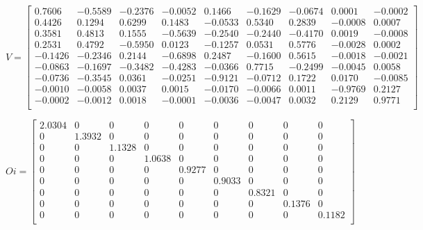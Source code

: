 \documentclass{article}
\begin{document}
$V = \begin{bmatrix}
     0.7606 & -0.5589 & -0.2376 & -0.0052 &  0.1466 & -0.1629 & -0.0674 &  0.0001 & -0.0002 \\ 
     0.4426 &  0.1294 &  0.6299 &  0.1483 & -0.0533 &  0.5340 &  0.2839 & -0.0008 &  0.0007 \\ 
     0.3581 &  0.4813 &  0.1555 & -0.5639 & -0.2540 & -0.2440 & -0.4170 &  0.0019 & -0.0008 \\ 
     0.2531 &  0.4792 & -0.5950 &  0.0123 & -0.1257 &  0.0531 &  0.5776 & -0.0028 &  0.0002 \\ 
    -0.1426 & -0.2346 &  0.2144 & -0.6898 &  0.2487 & -0.1600 &  0.5615 & -0.0018 & -0.0021 \\ 
    -0.0863 & -0.1697 & -0.3482 & -0.4283 & -0.0366 &  0.7715 & -0.2499 & -0.0045 &  0.0058 \\ 
    -0.0736 & -0.3545 &  0.0361 & -0.0251 & -0.9121 & -0.0712 &  0.1722 &  0.0170 & -0.0085 \\ 
    -0.0010 & -0.0058 &  0.0037 &  0.0015 & -0.0170 & -0.0066 &  0.0011 & -0.9769 &  0.2127 \\ 
    -0.0002 & -0.0012 &  0.0018 & -0.0001 & -0.0036 & -0.0047 &  0.0032 &  0.2129 &  0.9771 \\
    \end{bmatrix}$
    
$Oi = \begin{bmatrix}
     2.0304 &       0 &       0 &       0 &       0 &       0 &       0 &       0 &       0 \\ 
          0 &  1.3932 &       0 &       0 &       0 &       0 &       0 &       0 &       0 \\ 
          0 &       0 &  1.1328 &       0 &       0 &       0 &       0 &       0 &       0 \\ 
          0 &       0 &       0 &  1.0638 &       0 &       0 &       0 &       0 &       0 \\ 
          0 &       0 &       0 &       0 &  0.9277 &       0 &       0 &       0 &       0 \\ 
          0 &       0 &       0 &       0 &       0 &  0.9033 &       0 &       0 &       0 \\ 
          0 &       0 &       0 &       0 &       0 &       0 &  0.8321 &       0 &       0 \\ 
          0 &       0 &       0 &       0 &       0 &       0 &       0 &  0.1376 &       0 \\ 
          0 &       0 &       0 &       0 &       0 &       0 &       0 &       0 &  0.1182 \\
    \end{bmatrix}$
    
\end{document}
